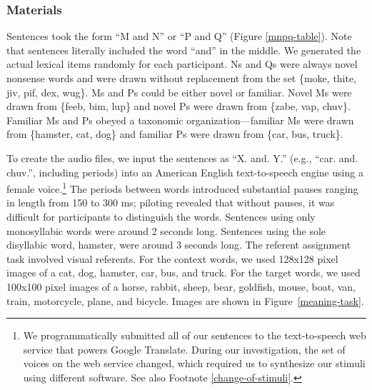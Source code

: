 \documentclass[man,floatsintext]{apa6}
\begin{document}
\subsubsection{Materials}
Sentences took the form ``M and N'' or ``P and Q'' (Figure \ref{mnpq-table}). Note that sentences literally included the word ``and'' in the middle. We generated the actual lexical items randomly for each participant. Ns and Qs were always novel nonsense words and were drawn without replacement from the set \{moke, thite, jiv, pif, dex, wug\}. Ms and Ps could be either novel or familiar. Novel Ms were drawn from \{feeb, bim, lup\} and novel Ps were drawn from \{zabe, vap, chuv\}. Familiar Ms and Ps obeyed a taxonomic organization---familiar Ms were drawn from \{hamster, cat, dog\} and familiar Ps were drawn from \{car, bus, truck\}.

To create the audio files, we input the sentences as ``X. and. Y.'' (e.g., ``car. and. chuv.'', including periods) into an American English text-to-speech engine using a female voice.\footnote{\label{tts} We programmatically submitted all of our sentences to the text-to-speech web service that powers Google Translate. During our investigation, the set of voices on the web service changed, which required us to synthesize our stimuli using different software. See also Footnote \ref{change-of-stimuli}.} The periods between words introduced substantial pauses ranging in length from 150 to 300 ms; piloting revealed that without pauses, it was difficult for participants to distinguish the words. Sentences using only monosyllabic words were around 2 seconds long. Sentences using the sole disyllabic word, hamster, were around 3 seconds long.  The referent assignment task involved visual referents. For the context words, we used 128x128 pixel images of a cat, dog, hamster, car, bus, and truck. For the target words, we used 100x100 pixel images of a horse, rabbit, sheep, bear, goldfish, mouse, boat, van, train, motorcycle, plane, and bicycle. Images are shown in Figure~\ref{meaning-task}.
\end{document}
